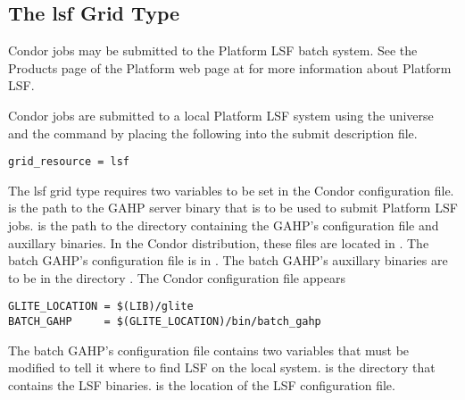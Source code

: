 
\subsection{\label{sec:LSF}The lsf Grid Type }

Condor jobs may be submitted to the Platform LSF batch system.
See the Products page of the Platform web page at
for more information about Platform LSF.

Condor jobs are submitted to a local Platform LSF system
using the  universe and the
 command  by placing the following
into the submit description file.
\begin{verbatim}
grid_resource = lsf
\end{verbatim}

The lsf grid type requires two variables to be set in the Condor
configuration file.
 is the path to the GAHP server binary that is to be
used to submit Platform LSF jobs.
 is the path to the directory containing the GAHP's
configuration file and auxillary binaries.
In the Condor distribution, these files are located in 
.
The batch GAHP's configuration file is in
.
The batch GAHP's auxillary binaries
are to be in the directory .
The Condor configuration file appears

\footnotesize
\begin{verbatim}
GLITE_LOCATION = $(LIB)/glite
BATCH_GAHP     = $(GLITE_LOCATION)/bin/batch_gahp
\end{verbatim}
\normalsize

The batch GAHP's configuration file contains two variables that must be
modified to tell it where to find LSF on the local system.
 is the directory that contains the LSF binaries.
 is the location of the LSF configuration file.
